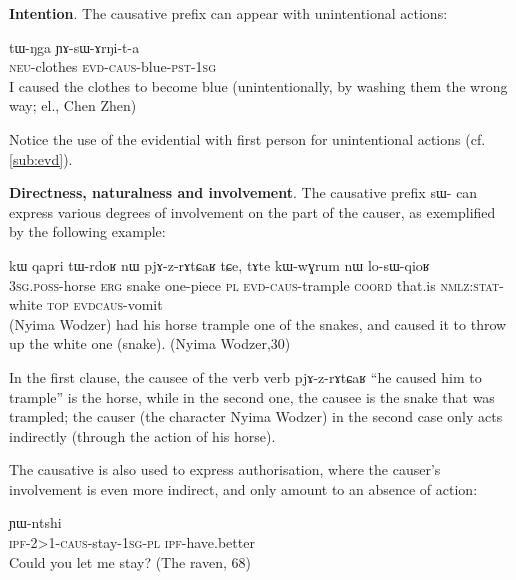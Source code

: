 \documentclass[oldfontcommands,oneside,a4paper,11pt]{memoir}
\newcommand{\ipa}[1]{{\phon #1}} %
\newcommand{\aor}{\textsc{aor}}
\newcommand{\auto}{\textsc{autoben}}
\newcommand{\caus}{\textsc{caus}}
\newcommand{\coord}{\textsc{coord}}
\newcommand{\erg}{\textsc{erg}}
\newcommand{\evd}{\textsc{evd}}
\newcommand{\ipf}{\textsc{ipf}}
\newcommand{\neu}{\textsc{neu}}
\newcommand{\nmlz}{\textsc{nmlz}}
\newcommand{\pl}{\textsc{pl}}
\newcommand{\poss}{\textsc{poss}}
\newcommand{\pst}{\textsc{pst}}
\newcommand{\sg}{\textsc{sg}}
\newcommand{\stat}{\textsc{stat}}
\newcommand{\topic}{\textsc{top}}
\begin{document}
 
   \textbf{Intention}. The causative prefix can appear with unintentional actions:
 \begin{exe}
\ex 
\gll 
\ipa{tɯ-ŋga} 	\ipa{ɲɤ-sɯ-ɤrŋi-t-a} \\
	\neu{}-clothes \evd{}-\caus{}-blue-\pst{}-1\sg{} \\
 \glt   I caused the clothes to become blue (unintentionally, by washing them the wrong way; el., Chen Zhen)
\end{exe}
Notice the use of the evidential with first person for unintentional actions (cf. \ref{sub:evd}).
 	

   \textbf{Directness, naturalness and involvement}.  The causative prefix \ipa{sɯ-} can express various degrees of involvement on the part of the causer, as exemplified by the following example:
 
  \begin{exe}
\ex 
\gll \ipa{ɯ-mbro} 	\ipa{kɯ} 	\ipa{qapri} 	\ipa{tɯ-rdoʁ} 	\ipa{nɯ} 	\ipa{pjɤ-z-rɤtɕaʁ} 	\ipa{tɕe,} 	\ipa{tɤte} 	\ipa{kɯ-wɣrum} 	\ipa{nɯ} 	\ipa{lo-sɯ-qioʁ} \\
3\sg{}.\poss{}-horse \erg{} snake one-piece \pl{} \evd{}-\caus{}-trample \coord{} that.is \nmlz{}:\stat{}-white \topic{} \evd{}\caus{}-vomit \\
 \glt  (Nyima Wodzer) had his horse trample one of the snakes, and caused it to throw up the white one (snake). (Nyima Wodzer,30)
\end{exe}
In the first  clause, the causee of the verb verb \ipa{pjɤ-z-rɤtɕaʁ} 	``he caused him to trample'' is the horse, while in the second one, the causee is the snake that was trampled; the causer (the character Nyima Wodzer) in the second case only acts indirectly (through the action of his horse).
 
 
 
 
 The causative is also used to express authorisation, where the causer's involvement is even more indirect, and only amount to an absence of action:

 \begin{exe}
\ex 
\gll \ipa{ku-kɯ-z-rɤʑi-a-nɯ} 	\ipa{ɲɯ-ntshi} \\
\ipf{}-2>1-\caus{}-stay-1\sg{}-\pl{} \ipf{}-have.better \\
 \glt  Could you let me stay? (The raven, 68)
\end{exe}
\end{document}
